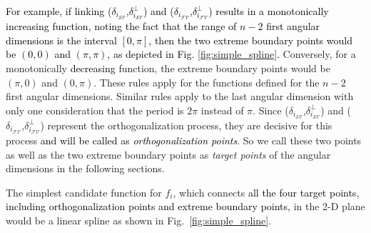 \textcolor{black}{For example, if linking ($\delta_{i_{{\mathcal{SV}}}}$,$\delta^{\perp}_{i_{{\mathcal{SV}}}}$) and ($\delta_{i_{{\mathcal{FV}}}}$,$\delta^{\perp}_{i_{{\mathcal{FV}}}}$) results in a monotonically increasing function, noting the fact that the range of $n-2$ first angular dimensions is the interval $[0, \pi]$, then the two extreme boundary points would be $(0,0)$ and $(\pi,\pi)$, as depicted in Fig. \ref{fig:simple_spline}.} Conversely, for a monotonically \textcolor{black}{decreasing} function, the extreme boundary points would be $(\pi,0)$ and $(0,\pi)$. These rules apply for the functions defined for the $n-2$ first angular dimensions. 
Similar rules apply to the last angular dimension with only one consideration that the period is $2\pi$ instead of $\pi$. Since  ($\delta_{i_{{\mathcal{SV}}}}$,$\delta^{\perp}_{i_{{\mathcal{SV}}}}$) and ($\delta_{i_{{\mathcal{FV}}}}$,$\delta^{\perp}_{i_{{\mathcal{FV}}}}$) represent the orthogonalization process, they are decisive for this process \textcolor{black}{and will be called as \textit{orthogonalization points}}. So we call these two points as well as the two extreme boundary points as \textit{target points} of the angular dimensions in the following sections. %

The simplest candidate function for $f_i$, which connects \textcolor{black}{all the four target points, including orthogonalization points and extreme boundary points,} in the 2-D plane would be a linear spline as shown in Fig.~\ref{fig:simple_spline}.


